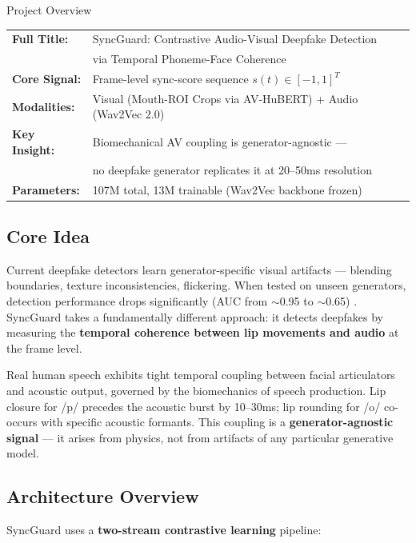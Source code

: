 \documentclass[12pt, letterpaper]{article}
\begin{document}
\begin{infobox}{Project Overview}
\begin{tabular}{@{}ll}
  \textbf{Full Title:}    & SyncGuard: Contrastive Audio-Visual Deepfake Detection \\
                          & via Temporal Phoneme-Face Coherence \\[4pt]
  \textbf{Core Signal:}   & Frame-level sync-score sequence $s(t) \in [-1, 1]^T$ \\[4pt]
  \textbf{Modalities:}    & Visual (Mouth-ROI Crops via AV-HuBERT) + Audio (Wav2Vec 2.0) \\[4pt]
  \textbf{Key Insight:}   & Biomechanical AV coupling is generator-agnostic — \\
                          & no deepfake generator replicates it at 20--50ms resolution \\[4pt]
  \textbf{Parameters:}    & 107M total, 13M trainable (Wav2Vec backbone frozen) \\
\end{tabular}
\end{infobox}

\subsection{Core Idea}

Current deepfake detectors learn generator-specific visual artifacts — blending boundaries, texture inconsistencies, flickering. When tested on unseen generators, detection performance drops significantly (AUC from $\sim$0.95 to $\sim$0.65) \cite{rossler2019}. SyncGuard takes a fundamentally different approach: it detects deepfakes by measuring the \textbf{temporal coherence between lip movements and audio} at the frame level.

Real human speech exhibits tight temporal coupling between facial articulators and acoustic output, governed by the biomechanics of speech production. Lip closure for /p/ precedes the acoustic burst by 10--30ms; lip rounding for /o/ co-occurs with specific acoustic formants. This coupling is a \textbf{generator-agnostic signal} — it arises from physics, not from artifacts of any particular generative model.

\subsection{Architecture Overview}

SyncGuard uses a \textbf{two-stream contrastive learning} pipeline:
\end{document}
